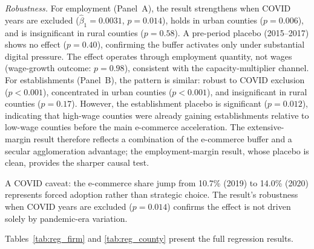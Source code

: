\documentclass[msom,dblanonrev]{informs4}
\begin{document}
\textit{Robustness.} For employment (Panel~A), the result strengthens when COVID years are excluded ($\hat{\beta}_1 = 0.0031$, $p = 0.014$), holds in urban counties ($p = 0.006$), and is insignificant in rural counties ($p = 0.58$). A pre-period placebo (2015--2017) shows no effect ($p = 0.40$), confirming the buffer activates only under substantial digital pressure. The effect operates through employment quantity, not wages (wage-growth outcome: $p = 0.98$), consistent with the capacity-multiplier channel. For establishments (Panel~B), the pattern is similar: robust to COVID exclusion ($p < 0.001$), concentrated in urban counties ($p < 0.001$), and insignificant in rural counties ($p = 0.17$). However, the establishment placebo is significant ($p = 0.012$), indicating that high-wage counties were already gaining establishments relative to low-wage counties before the main e-commerce acceleration. The extensive-margin result therefore reflects a combination of the e-commerce buffer and a secular agglomeration advantage; the employment-margin result, whose placebo is clean, provides the sharper causal test.

A COVID caveat: the e-commerce share jump from 10.7\% (2019) to 14.0\% (2020) represents forced adoption rather than strategic choice. The result's robustness when COVID years are excluded ($p = 0.014$) confirms the effect is not driven solely by pandemic-era variation.

Tables~\ref{tab:reg_firm} and \ref{tab:reg_county} present the full regression results.
\end{document}
